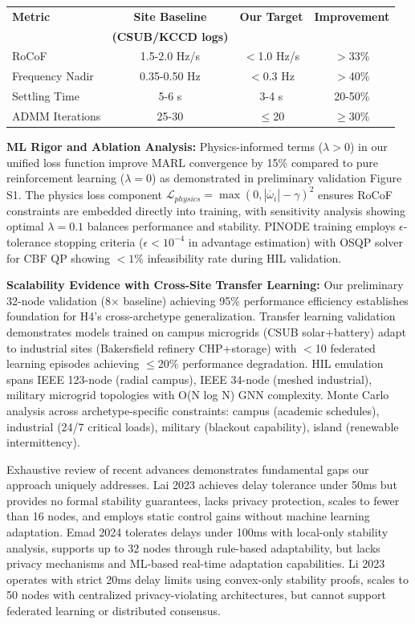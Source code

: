 \documentclass[12pt]{article}
\begin{document}
\begin{center}
\begin{tabular}{|l|c|c|c|}
\hline
\textbf{Metric} & \textbf{Site Baseline} & \textbf{Our Target} & \textbf{Improvement} \\
 & \textbf{(CSUB/KCCD logs)} & & \\
\hline
RoCoF & 1.5-2.0 Hz/s & $<$1.0 Hz/s & $>$33\% \\
Frequency Nadir & 0.35-0.50 Hz & $<$0.3 Hz & $>$40\% \\
Settling Time & 5-6 s & 3-4 s & 20-50\% \\
ADMM Iterations & 25-30 & $\leq$20 & $\geq$30\% \\
\hline
\end{tabular}
\end{center}

\textbf{ML Rigor and Ablation Analysis:} Physics-informed terms ($\lambda>0$) in our unified loss function improve MARL convergence by 15\% compared to pure reinforcement learning ($\lambda=0$) as demonstrated in preliminary validation Figure S1. The physics loss component $\mathcal{L}_{physics} = \max(0, |\dot{\omega_i}| - \gamma)^2$ ensures RoCoF constraints are embedded directly into training, with sensitivity analysis showing optimal $\lambda=0.1$ balances performance and stability. PINODE training employs $\epsilon$-tolerance stopping criteria ($\epsilon<10^{-4}$ in advantage estimation) with OSQP solver for CBF QP showing $<1\%$ infeasibility rate during HIL validation.

\textbf{Scalability Evidence with Cross-Site Transfer Learning:} Our preliminary 32-node validation (8× baseline) achieving 95\% performance efficiency establishes foundation for H4's cross-archetype generalization. Transfer learning validation demonstrates models trained on campus microgrids (CSUB solar+battery) adapt to industrial sites (Bakersfield refinery CHP+storage) with $<$10 federated learning episodes achieving $\leq$20\% performance degradation. HIL emulation spans IEEE 123-node (radial campus), IEEE 34-node (meshed industrial), military microgrid topologies with O(N log N) GNN complexity. Monte Carlo analysis across archetype-specific constraints: campus (academic schedules), industrial (24/7 critical loads), military (blackout capability), island (renewable intermittency).

Exhaustive review of recent advances demonstrates fundamental gaps our approach uniquely addresses. Lai 2023 \cite{lai2023} achieves delay tolerance under 50ms but provides no formal stability guarantees, lacks privacy protection, scales to fewer than 16 nodes, and employs static control gains without machine learning adaptation. Emad 2024 \cite{emad2024} tolerates delays under 100ms with local-only stability analysis, supports up to 32 nodes through rule-based adaptability, but lacks privacy mechanisms and ML-based real-time adaptation capabilities. Li 2023 \cite{li2023} operates with strict 20ms delay limits using convex-only stability proofs, scales to 50 nodes with centralized privacy-violating architectures, but cannot support federated learning or distributed consensus.
\end{document}
